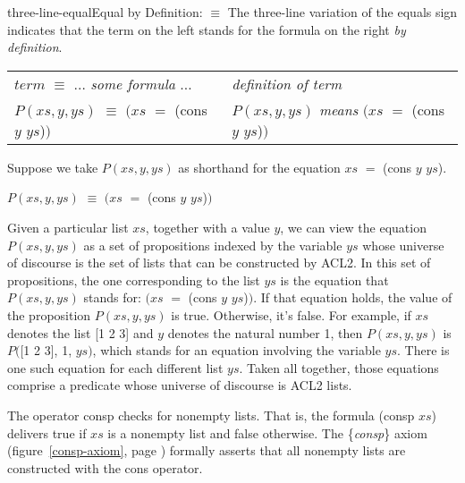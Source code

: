 \begin{aside}{three-line-equal}{Equal by Definition: $\equiv$}
The
three-line
variation of the equals sign
indicates that the term on the left stands
for the formula on the right \emph{by definition}.
\begin{center}
\addtolength{\tabcolsep}{-2pt}
\begin{tabular}{ll}
$term$ $\equiv$ $\dots$ \emph{some formula} $\dots$    &\emph{definition of term} \\
$P(xs, y, ys)$ $\equiv$ $(xs$ $=$ \textsf{(cons $y$ $ys$)}$)$ &$P(xs, y, ys)$ \emph{means} $(xs$ $=$ \textsf{(cons $y$ $ys$)}$)$  \\
\end{tabular}
\addtolength{\tabcolsep}{2pt}
\end{center}
\end{aside}

Suppose we take $P(xs, y, ys)$ as shorthand
for the equation $xs$ $=$ \textsf{(cons $y$ $ys$)}.
\begin{center}
$P(xs, y, ys)$ $\equiv$ $(xs$ $=$ \textsf{(cons $y$ $ys$)}$)$
\end{center}

Given a particular list $xs$, together with a value $y$,
we can view the equation $P(xs, y, ys)$ as a set of propositions
indexed by the variable $ys$ whose universe of discourse is the set of
lists that can be constructed by ACL2.
In this set of propositions, the one corresponding to
the list $ys$ is the equation that $P(xs, y, ys)$ stands for:
$(xs$ $=$ \textsf{(cons $y$ $ys$)}$)$.
If that equation holds, the value of the proposition $P(xs, y, ys)$ is true.
Otherwise, it's false.
For example, if $xs$ denotes the list \textsf{[1 2 3]}
and $y$ denotes the natural number \textsf{1},
then $P(xs, y, ys)$ is $P($\textsf{[1 2 3]}, \textsf{1}, $ys)$,
which stands for an equation involving the variable $ys$.
There is one such equation for each different list $ys$.
Taken all together, those equations comprise a predicate
whose universe of discourse is ACL2 lists.

The operator 
\textsf{consp}
checks for nonempty lists.
That is, the formula \textsf{(consp $xs$)} delivers true
if $xs$ is a nonempty list and false otherwise.
The \{\emph{consp}\} axiom
(figure~\ref{consp-axiom}, page \pageref{consp-axiom})
formally asserts that all nonempty lists
are constructed with the \textsf{cons} operator.


